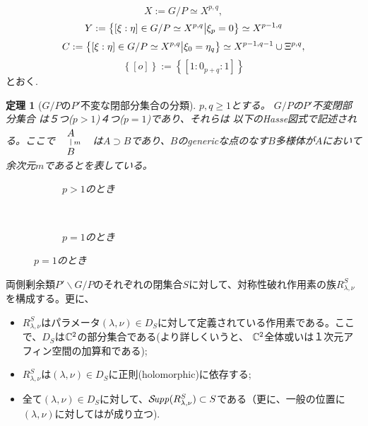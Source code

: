 \documentclass[12pt]{article} %
\newtheorem{theorem}{定理}
\newcommand{\Supp}{\mathcal{S}\!{\it upp}}
\theoremstyle{definition}
\theoremstyle{exampstyle} \newtheorem{examp}[theorem]{Theorem}
\newcommand{\doubt}[1]{\uwave{#1}}
\begin{document}
\[
X:=G/P\simeq X^{p,q},\]\[Y:=\left\{[\xi:\eta]\in G/P\simeq X^{p,q}\big| \xi_{p}=0\right\}\simeq X^{p-1,q}\]
\[C:=\left\{[\xi:\eta]\in G/P\simeq X^{p,q}\big| \xi_{0}=\eta_q\right\}\simeq X^{p-1,q-1}\cup\Xi^{p,q},\]\[\left\{ [o] \right\}:=\left\{ [1:0_{p+q}:1] \right\}\]
{とおく.}
\begin{theorem}[$G/P$の$P'$不変な閉部分集合の分類]
	$p,q\ge1$とする。
	$G/P$の$P'$不変閉部分集合
は５つ($p>1$)\doubt{または}４つ($p=1$)であり、それらは
以下のHasse図式で記述される。ここで
	$
	\begin{array}{l}
	        \xymatrixrowsep{0.5pc}
		\xymatrix{A\ar@{-}[d]^m\\B}
	\end{array}
	$
	は$A\supset B$であり、$B$のgenericな点のなす$B$多様体が$A$において余次元$m$であるとを表している。\\
  \begin{figure}[H]
    \centering
    \begin{subfigure}[t]{0.3\textwidth}
	    \xymatrixrowsep{0.5pc}
	\caption{$p>1$のとき}
    \end{subfigure}
    ~ %
    \begin{subfigure}[t]{0.3\textwidth}
	    \xymatrixrowsep{0.5pc}
	    {}
	\caption{$p=1$のとき}
    \end{subfigure}
\end{figure}
\end{theorem}
両側剰余類$P'\backslash G/P$のそれぞれの閉集合$S$に対して、対称性破れ作用素の族$R^S_{\lambda,\nu}$を構成する。更に、
\begin{itemize}
	\item $R_{\lambda,\nu}^S$はパラメータ$(\lambda,\nu)\in D_S$に対して定義されている作用素である。ここで、$D_S$は$\mathbb{C}^2$の部分集合である(より詳しくいうと、
		$\mathbb{C}^2$全体或いは１次元アフィン空間の加算和である);
	\item $R_{\lambda,\nu}^S$は$(\lambda,\nu)\in D_S$に正則(holomorphic)に依存する;
	\item 全て$(\lambda,\nu)\in D_S$に対して、$\Supp(R_{\lambda,\nu}^S)\subset S$である（更に、一般の位置に\doubt{ある}$(\lambda,\nu)$に対しては\doubt{等号}が成り立つ).
\end{itemize}
\end{document}

